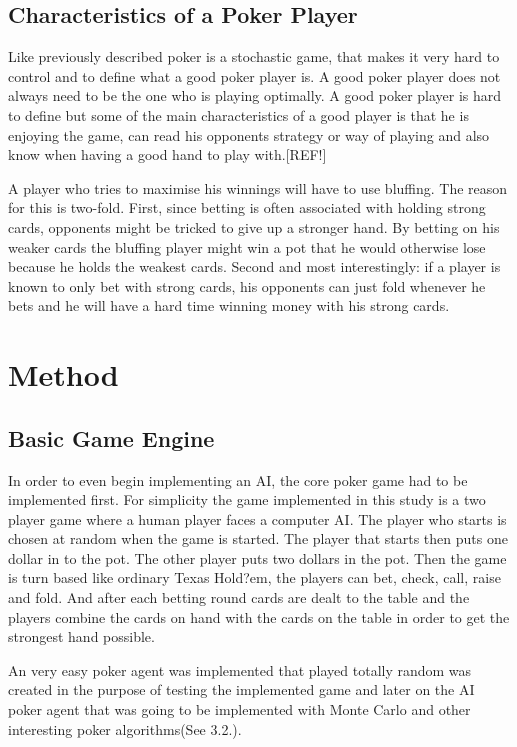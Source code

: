 \documentclass[journal]{vgtc}                %
\begin{document}
\subsection{Characteristics of a Poker Player}
Like previously described poker is a stochastic game, that makes it very hard to control and to define what a good poker player is. A good poker player does not always need to be the one who is playing optimally. A good poker player is hard to define but some of the main characteristics of a good player is that he is enjoying the game, can read his opponents strategy or way of playing and also know when having a good hand to play with.[REF!]

A player who tries to maximise his winnings will have to use bluffing. The reason for this is two-fold. First, since betting is often associated with holding strong cards, opponents might be tricked to give up a stronger hand. By betting on his weaker cards the bluffing player might win a pot that he would otherwise lose because he holds the weakest cards. Second and most interestingly: if a player is known to only bet with strong cards, his opponents can just fold whenever he bets and he will have a hard time winning money with his strong cards.  

\section{Method}
\subsection{Basic Game Engine}
In order to even begin implementing an AI, the core poker game had to be implemented first. For simplicity the game implemented in this study is a two player game where a human player faces a computer AI. The player who starts is chosen at random when the game is started. The player that starts then puts one dollar in to the pot. The other player puts two dollars in the pot. Then the game is turn based like ordinary Texas Hold?em, the players can bet, check, call, raise and fold. And after each betting round cards are dealt to the table and the players combine the cards on hand with the cards on the table in order to get the strongest hand possible. 

An very easy poker agent was implemented that played totally random was created in the purpose of testing the implemented game and later on the AI poker agent that was going to be implemented with Monte Carlo and other interesting poker algorithms(See 3.2.).
\end{document}
